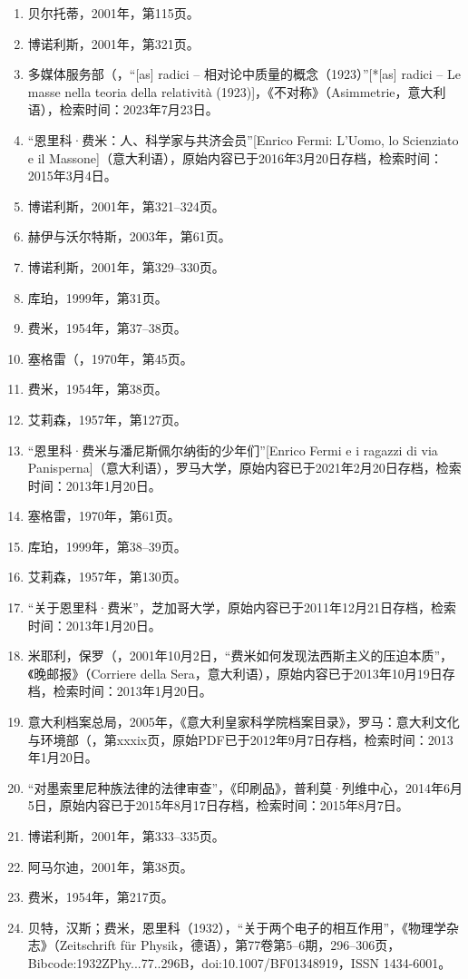 \begin{enumerate}
\item 贝尔托蒂，2001年，第115页。
\item 博诺利斯，2001年，第321页。
\item 多媒体服务部（，“[as] radici – 相对论中质量的概念（1923）”[*[as] radici – Le masse nella teoria della relatività (1923)]，《不对称》（Asimmetrie，意大利语），检索时间：2023年7月23日。
\item “恩里科·费米：人、科学家与共济会员”[Enrico Fermi: L'Uomo, lo Scienziato e il Massone]（意大利语），原始内容已于2016年3月20日存档，检索时间：2015年3月4日。
\item 博诺利斯，2001年，第321–324页。
\item 赫伊与沃尔特斯，2003年，第61页。
\item 博诺利斯，2001年，第329–330页。
\item 库珀，1999年，第31页。
\item 费米，1954年，第37–38页。
\item 塞格雷（，1970年，第45页。
\item 费米，1954年，第38页。
\item 艾莉森，1957年，第127页。
\item “恩里科·费米与潘尼斯佩尔纳街的少年们”[Enrico Fermi e i ragazzi di via Panisperna]（意大利语），罗马大学，原始内容已于2021年2月20日存档，检索时间：2013年1月20日。
\item 塞格雷，1970年，第61页。
\item 库珀，1999年，第38–39页。
\item 艾莉森，1957年，第130页。
\item “关于恩里科·费米”，芝加哥大学，原始内容已于2011年12月21日存档，检索时间：2013年1月20日。
\item 米耶利，保罗（，2001年10月2日，“费米如何发现法西斯主义的压迫本质”，《晚邮报》（Corriere della Sera，意大利语），原始内容已于2013年10月19日存档，检索时间：2013年1月20日。
\item 意大利档案总局，2005年，《意大利皇家科学院档案目录》，罗马：意大利文化与环境部（，第xxxix页，原始PDF已于2012年9月7日存档，检索时间：2013年1月20日。
\item “对墨索里尼种族法律的法律审查”，《印刷品》，普利莫·列维中心，2014年6月5日，原始内容已于2015年8月17日存档，检索时间：2015年8月7日。
\item 博诺利斯，2001年，第333–335页。
\item 阿马尔迪，2001年，第38页。
\item 费米，1954年，第217页。
\item 贝特，汉斯；费米，恩里科（1932），“关于两个电子的相互作用”，《物理学杂志》（Zeitschrift für Physik，德语），第77卷第5–6期，296–306页，Bibcode:1932ZPhy...77..296B，doi:10.1007/BF01348919，ISSN 1434-6001。

\end{enumerate}
